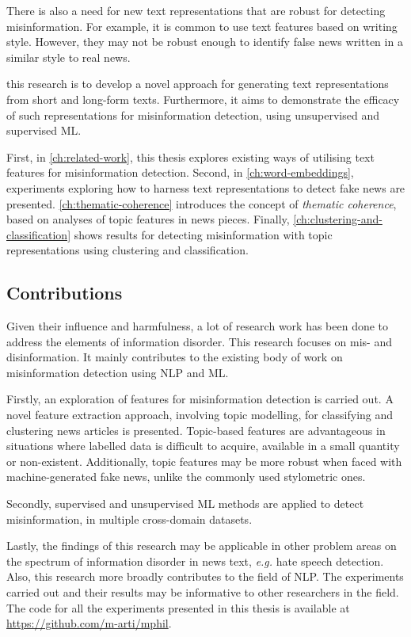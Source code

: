 There is also a need for new text representations that are robust for detecting misinformation. For example, it is common to use text features based on writing style. However, they may not be robust enough to identify false news written in a similar style to real news.

 this research is to develop a novel approach for generating text representations from short and long-form texts. Furthermore, it aims to demonstrate the efficacy of such representations for misinformation detection, using unsupervised and supervised \ac{ML}.

First, in \autoref{ch:related-work}, this thesis explores existing ways of utilising text features for misinformation detection. Second, in \autoref{ch:word-embeddings}, experiments exploring how to harness text representations to detect fake news are presented. \autoref{ch:thematic-coherence} introduces the concept of \emph{thematic coherence}, based on analyses of topic features in news pieces. Finally, \autoref{ch:clustering-and-classification} shows results for detecting misinformation with topic representations using clustering and classification.

\subsection{Contributions}
\label{ssec:1-contributions}

Given their influence and harmfulness, a lot of research work has been done to address the elements of information disorder. This research focuses on mis- and disinformation. It mainly contributes to the existing body of work on misinformation detection using \ac{NLP} and \ac{ML}.

Firstly, an exploration of features for misinformation detection is carried out. A novel feature extraction approach, involving topic modelling, for classifying and clustering news articles is presented. Topic-based features are advantageous in situations where labelled data is difficult to acquire, available in a small quantity or non-existent. Additionally, topic features may be more robust when faced with machine-generated fake news, unlike the commonly used stylometric ones.

Secondly, supervised and unsupervised \ac{ML} methods are applied to detect misinformation, in multiple cross-domain datasets.

Lastly, the findings of this research may be applicable in other problem areas on the spectrum of information disorder in news text, \emph{e.g.} hate speech detection. Also, this research more broadly contributes to the field of \ac{NLP}. The experiments carried out and their results may be informative to other researchers in the field. The code for all the experiments presented in this thesis is available at \href{https://github.com/m-arti/mphil}{\url{https://github.com/m-arti/mphil}}.

